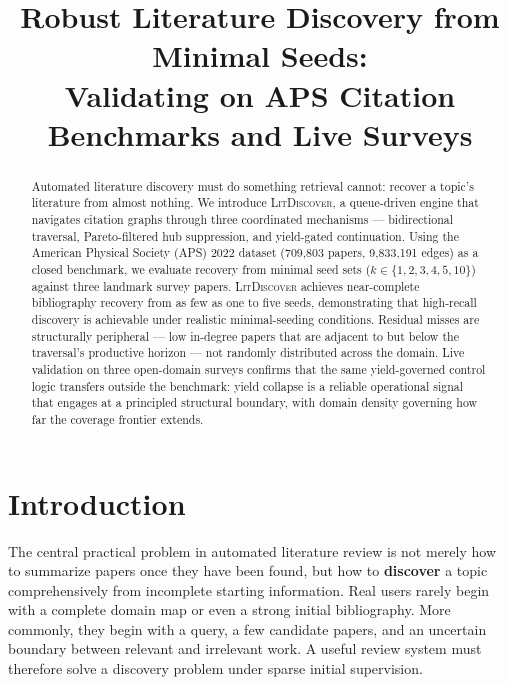 \documentclass[manuscript,review,anonymous]{acmart}
\title{Robust Literature Discovery from Minimal Seeds:\\
  Validating \ldiscover{} on APS Citation Benchmarks and Live Surveys}
\newcommand{\ldiscover}{\textsc{LitDiscover}}
\begin{document}
\begin{abstract}
Automated literature discovery must do something retrieval cannot: recover a topic's
literature from almost nothing. We introduce \ldiscover{}, a queue-driven engine
that navigates citation graphs through three coordinated mechanisms --- bidirectional
traversal, Pareto-filtered hub suppression, and yield-gated continuation. Using the
American Physical Society (APS) 2022 dataset (709,803 papers, 9,833,191 edges) as a
closed benchmark, we evaluate recovery from minimal seed sets ($k \in \{1,2,3,4,5,10\}$)
against three landmark survey papers. \ldiscover{} achieves near-complete bibliography
recovery from as few as one to five seeds, demonstrating that high-recall discovery is
achievable under realistic minimal-seeding conditions. Residual misses are structurally
peripheral --- low in-degree papers that are adjacent to but below the traversal's
productive horizon --- not randomly distributed across the domain. Live validation on three
open-domain surveys confirms that the same yield-governed control logic transfers outside
the benchmark: yield collapse is a reliable operational signal that engages at a principled
structural boundary, with domain density governing how far the coverage frontier extends.
\end{abstract}

\maketitle

\section{Introduction}

The central practical problem in automated literature review is not merely how to summarize
papers once they have been found, but how to \textbf{discover} a topic comprehensively from
incomplete starting information. Real users rarely begin with a complete domain map or even
a strong initial bibliography. More commonly, they begin with a query, a few candidate
papers, and an uncertain boundary between relevant and irrelevant work. A useful review
system must therefore solve a discovery problem under sparse initial supervision.
\end{document}
